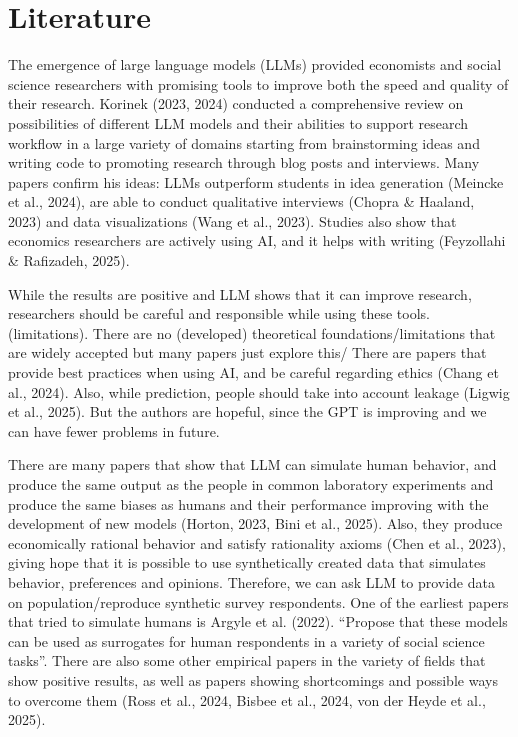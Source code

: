 \documentclass[12pt]{article}
\begin{document}
\section{Literature}
The emergence of large language models (LLMs) provided economists and social science researchers with promising tools to improve both the speed and quality of their research. Korinek (2023, 2024) conducted a comprehensive review on possibilities of different LLM models and their abilities to support research workflow in a large variety of domains starting from brainstorming ideas and writing code to promoting research through blog posts and interviews. Many papers confirm his ideas: LLMs outperform students in idea generation (Meincke et al., 2024), are able to conduct qualitative interviews (Chopra \& Haaland, 2023) and data visualizations (Wang et al., 2023). Studies also show that economics researchers are actively using AI, and it helps with writing (Feyzollahi \& Rafizadeh, 2025).

While the results are positive and LLM shows that it can improve research, researchers should be careful and responsible while using these tools. (limitations). There are no (developed) theoretical foundations/limitations that are widely accepted but many papers just explore this/  There are papers that provide best practices when using AI, and be careful regarding ethics (Chang et al., 2024). Also, while prediction, people should take into account leakage (Ligwig et al., 2025). But the authors are hopeful, since the GPT is improving and we can have fewer problems in future.

There are many papers that show that LLM can simulate human behavior, and produce the same output as the people in common laboratory experiments and produce the same biases as humans and their performance improving with the development of new models (Horton, 2023, Bini et al., 2025). Also, they produce economically rational behavior and satisfy rationality axioms (Chen et al., 2023), giving hope that it is possible to use synthetically created data that simulates behavior, preferences and opinions. Therefore, we can ask LLM to provide data on population/reproduce synthetic survey respondents. One of the earliest papers that tried to simulate humans is Argyle et al. (2022). “Propose that these models can be used as surrogates for human respondents in a variety of social science tasks”. There are also some other empirical papers in the variety of fields that show positive results, as well as papers showing shortcomings and possible ways to overcome them (Ross et al., 2024, Bisbee et al., 2024, von der Heyde et al., 2025).
\end{document}
